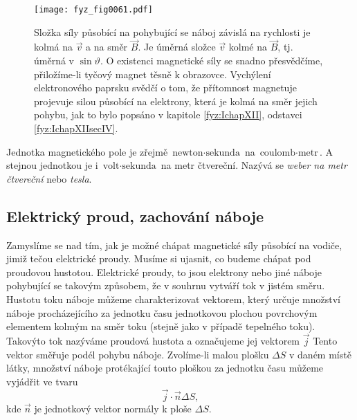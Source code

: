     \begin{figure}[ht!]  %
      \centering
      \texttt{[image: fyz\_fig0061.pdf]}
      \caption{Složka síly působící na pohybující se náboj závislá na rychlosti je kolmá na 
               \(\vec{v}\) a na směr \(\vec{B}\). Je úměrná složce \(\vec{v}\) kolmé na 
               \(\vec{B}\), tj. úměrná v \(\sin\vartheta\). O existenci magnetické síly se snadno 
                přesvědčíme, přiložíme-li tyčový magnet těsně k obrazovce. Vychýlení elektronového 
                paprsku svědčí o tom, že přítomnost magnetuje projevuje silou působící na 
                elektrony, která je kolmá na směr jejich pohybu, jak to bylo popsáno v kapitole 
                \ref{fyz:IchapXII}, odstavci \ref{fyz:IchapXIIsecIV}.
                \cite[s.~225]{Feynman02}}
      \label{fyz:fig0061}
    \end{figure}
    
    Jednotka magnetického pole je zřejmě \(\text{newton}\cdot\text{sekunda}\) na \(\text{coulomb} 
    \cdot \text{metr}\). A stejnou jednotkou je i \(\text{volt}\cdot\text{sekunda}\) na metr 
    čtvereční. Nazývá se \emph{weber na metr čtvereční} nebo \emph{tesla}.

    \subsection{Elektrický proud, zachování náboje}
      \cite[s.~225]{Feynman02} Zamyslíme se nad tím, jak je možné chápat magnetické síly působící 
      na vodiče, jimiž tečou elektrické proudy. Musíme si ujasnit, co budeme chápat pod proudovou 
      hustotou. Elektrické proudy, to jsou elektrony nebo jiné náboje pohybující se takovým 
      způsobem, že v souhrnu vytváří tok v jistém směru. Hustotu toku náboje můžeme charakterizovat 
      vektorem, který určuje množství náboje procházejícího za jednotku času jednotkovou plochou 
      povrchovým elementem kolmým na směr toku (stejně jako v případě tepelného toku). Takovýto tok 
      nazýváme proudová hustota a označujeme jej vektorem \(\vec{j}\) Tento vektor směřuje podél 
      pohybu náboje. Zvolíme-li malou plošku \(\Delta S\) v daném místě látky, množství náboje 
      protékající touto ploškou za jednotku času můžeme vyjádřit ve tvaru
      \begin{equation}\label{eq_fyz:mag001}
        \vec{j}\cdot\vec{n}\Delta S,
      \end{equation} 
      kde \(\vec{n}\) je jednotkový vektor normály k ploše \(\Delta S\).
      
